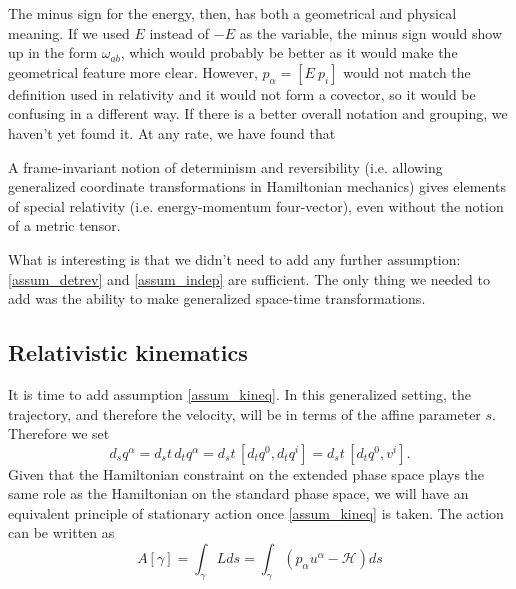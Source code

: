 The minus sign for the energy, then, has both a geometrical and physical meaning. If we used $E$ instead of $-E$ as the variable, the minus sign would show up in the form $\omega_{ab}$, which would probably be better as it would make the geometrical feature more clear. However, $p_\alpha = [ E \ p_i]$ would not match the definition used in relativity and it would not form a covector, so it would be confusing in a different way. If there is a better overall notation and grouping, we haven't yet found it. At any rate, we have found that
\begin{insight}
	A frame-invariant notion of determinism and reversibility (i.e. allowing generalized coordinate transformations in Hamiltonian mechanics) gives elements of special relativity (i.e. energy-momentum four-vector), even without the notion of a metric tensor.
\end{insight}

What is interesting is that we didn't need to add any further assumption: \ref{assum_detrev} and \ref{assum_indep} are sufficient. The only thing we needed to add was the ability to make generalized space-time transformations.

\subsection{Relativistic kinematics}

It is time to add assumption \ref{assum_kineq}. In this generalized setting, the trajectory, and therefore the velocity, will be in terms of the affine parameter $s$. Therefore we set
\begin{equation}
	d_s q^\alpha  = d_s t \, d_t q^\alpha = d_s t \, [ d_t q^0, d_t q^i  ] = d_s t \, [ d_t q^0, v^i  ] .
\end{equation}
Given that the Hamiltonian constraint on the extended phase space plays the same role as the Hamiltonian on the standard phase space, we will have an equivalent principle of stationary action once \ref{assum_kineq} is taken. The action can be written as
\begin{equation}
	A[\gamma] = \int_\gamma Lds = \int_\gamma \left( p_\alpha u^\alpha - \mathcal{H} \right) ds
\end{equation}

